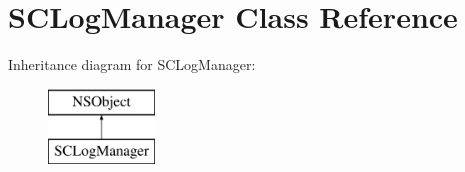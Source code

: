 \hypertarget{interface_s_c_log_manager}{}\section{S\+C\+Log\+Manager Class Reference}
\label{interface_s_c_log_manager}
Inheritance diagram for S\+C\+Log\+Manager\+:\begin{figure}[H]
\begin{center}
\leavevmode
\includegraphics[height=2.000000cm]{interface_s_c_log_manager}
\end{center}
\end{figure}
